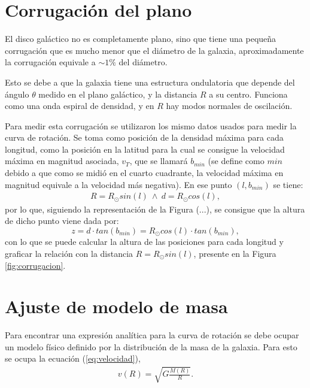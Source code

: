 \documentclass[letterpaper,oneside]{article}
\begin{document}
\section{Corrugación del plano}
El disco galáctico no es completamente plano, sino que tiene una pequeña corrugación que es mucho menor que el diámetro de la galaxia, aproximadamente la corrugación equivale a  $\sim 1\%$ del diámetro.

Esto se debe a que la galaxia tiene una estructura ondulatoria que depende del ángulo $\theta$ medido en el plano galáctico, y la distancia $R$ a su centro. Funciona como una onda espiral de densidad, y en $R$ hay modos normales de oscilación. %

Para medir esta corrugación se utilizaron los mismo datos usados para medir la curva de rotación. Se toma como posición de la densidad máxima para cada longitud, como la posición en la latitud para la cual se consigue la velocidad máxima en magnitud asociada, $v_{T}$, que se llamará $b_{min}$ (se define como $min$ debido a que como se midió en el cuarto cuadrante, la velocidad máxima en magnitud equivale a la velocidad más negativa). En ese punto $(l,b_{min})$ se tiene:
\begin{gather*}
R=R_{\odot}sin(l) \ \land \ d=R_{\odot}cos(l),
\end{gather*}
por lo que, siguiendo la representación de la Figura (...), se consigue que la altura de dicho punto viene dada por:
\begin{equation*}
z=d\cdot tan(b_{min})=R_{\odot}cos(l)\cdot tan(b_{min}),
\end{equation*}
con lo que se puede calcular la altura de las posiciones para cada longitud y graficar la relación con la distancia $R=R_{\odot}sin(l)$, presente en la Figura \ref{fig:corrugacion}.

\section{Ajuste de modelo de masa}
Para encontrar una expresión analítica para la curva de rotación se debe ocupar un modelo físico definido por la distribución de la masa de la galaxia. Para esto se ocupa la ecuación (\ref{eq:velocidad}),
\begin{gather*}
v(R)=\sqrt{G\frac{M(R)}{R}}.
\end{gather*}
\end{document}

